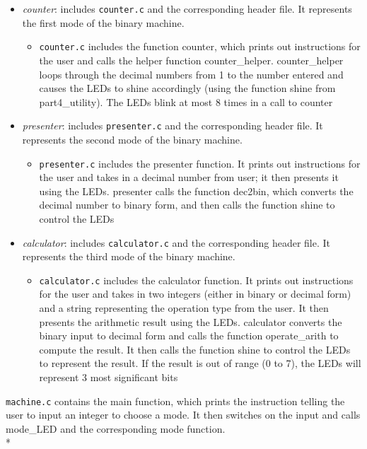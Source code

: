 \documentclass[letterpaper,11pt]{article}
\begin{document}
\begin{itemize}
        \item \textit{counter}: includes \texttt{counter.c} and the corresponding header file. It represents the first mode of the binary machine.
        \begin{itemize}
            \item \texttt{counter.c} includes the function counter, which prints out instructions for the user and calls the helper function counter\_helper.  counter\_helper loops through the decimal numbers from 1 to the number entered and causes the LEDs to shine accordingly (using the function shine from part4\_utility). The LEDs blink at most 8 times in a call to counter
        \end{itemize}
        \item \textit{presenter}: includes \texttt{presenter.c} and the corresponding header file. It represents the second mode of the binary machine.
        \begin{itemize}
            \item \texttt{presenter.c} includes the presenter function. It prints out instructions for the user and takes in a decimal number from user; it then presents it using the LEDs. presenter calls the function dec2bin, which converts the decimal number to binary form, and then calls the function shine to control the LEDs
        \end{itemize}

        \item \textit{calculator}: includes \texttt{calculator.c} and the corresponding header file. It represents the third mode of the binary machine.
        \begin{itemize}
            \item \texttt{calculator.c} includes the calculator function. It prints out instructions for the user and takes in two integers (either in binary or decimal form) and a string representing the operation type from the user. It then presents the arithmetic result using the LEDs. calculator converts the binary input to decimal form and calls the function operate\_arith to compute the result. It then calls the function shine to control the LEDs to represent the result. If the result is out of range (0 to 7), the LEDs will represent 3 most significant bits
        \end{itemize}
    \end{itemize}

    \noindent \texttt{machine.c} contains the main function, which prints the instruction telling the user to input an integer to choose a mode. It then switches on the input and calls mode\_LED and the corresponding mode function. \\*
\end{document}
